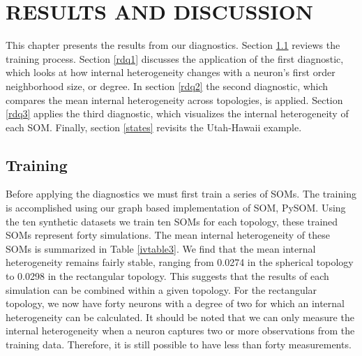 \chapter{RESULTS AND DISCUSSION}
This chapter presents the results from our diagnostics.  Section \ref{rtrain}
reviews the training process.  Section \ref{rdq1} discusses the application of
the first diagnostic, which looks at how internal heterogeneity changes with a
neuron's first order neighborhood size, or degree.  In section \ref{rdq2} the
second diagnostic, which compares the mean internal heterogeneity across
topologies, is applied.  Section \ref{rdq3} applies the third
diagnostic, which visualizes the internal heterogeneity of each SOM. Finally,
section \ref{states} revisits the Utah-Hawaii example.

\section{Training}
\label{rtrain}
Before applying the diagnostics we must first train a series of SOMs.  The
training is accomplished using our graph based implementation of SOM, PySOM.
Using the ten synthetic datasets we train ten SOMs for each topology, these
trained SOMs represent forty simulations.  The
mean internal heterogeneity of these SOMs is summarized in Table
\ref{ivtable3}.  We find that the mean internal heterogeneity remains fairly
stable, ranging from 0.0274 in the spherical topology to 0.0298 in the
rectangular topology. This suggests that the results of each simulation can be combined within
a given topology.  For the rectangular topology, we now have forty neurons
with a degree of two for which an internal heterogeneity can be calculated. It
should be noted that we can only measure the internal heterogeneity when a
neuron captures two or more observations from the training data.  Therefore,
it is still possible to have less than forty measurements.

